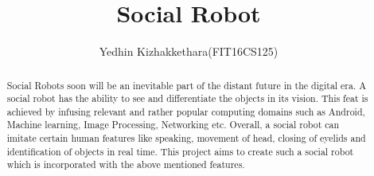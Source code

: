 \documentclass{fisatproject}
\title{Social Robot}
\author{Yedhin Kizhakkethara(FIT16CS125)}
\begin{document}
\maketitle

\makecert

\newpage
{}
\setcounter{page}{1}
\renewcommand\abstractname{ABSTRACT}
\begin{abstract}
\vspace{5cm}
Social Robots soon will be an inevitable part of the distant future in the digital era. A social robot has the ability to see and differentiate the objects in its vision. This feat is achieved by infusing relevant and rather popular computing domains such as Android, Machine learning, Image Processing, Networking etc. Overall, a social robot can imitate certain human features like speaking, movement of head, closing of eyelids and identification of objects in real time. This project aims to create such a social robot which is incorporated with the above mentioned features.
\end{abstract}
\end{document}

